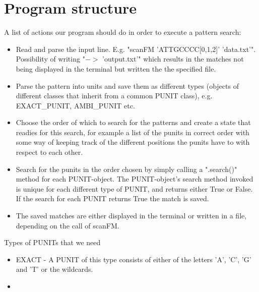 \documentclass[12pt]{article}
\begin{document}
\section{Program structure}
A list of actions our program should do in order to execute a pattern search:
\begin{itemize}
\item Read and parse the input line. E.g. "scanFM 'ATTGCCCC[0,1,2]' 'data.txt'". Possibility of writing "$->$ 'output.txt'"
which results in the matches not being displayed in the terminal but written the the specified file.
\item Parse the pattern into units and save them as different types (objects of different classes that inherit
from a common PUNIT class), e.g. EXACT\_PUNIT, AMBI\_PUNIT etc.
\item Choose the order of which to search for the patterns and create a state that readies for this search, for example a 
list of the punits in correct order with some way of keeping track of the different positions the punits have to with
respect to each other.
\item Search for the punits in the order chosen by simply calling a ".search()" method for each PUNIT-object.
The PUNIT-object's search method invoked is unique for each different type of PUNIT, and returns either True or False.
If the search for each PUNIT returns True the match is saved.
\item The saved matches are either displayed in the terminal or written in a file, depending on the call of scanFM. 
\end{itemize}
Types of PUNITs that we need
\begin{itemize}
\item EXACT - A PUNIT of this type consists of either of the letters 'A', 'C', 'G' and 'T' or the wildcards.
\item  
\end{itemize}
\end{document}
